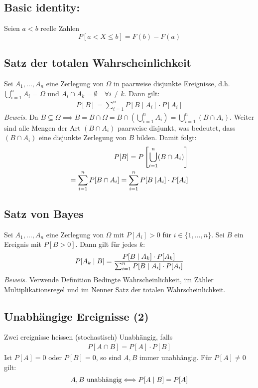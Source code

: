 \subsection{Basic identity:}
	Seien $a < b$ reelle Zahlen
	\begin{equation*}
		P [a < X \leq b] = F(b) - F(a)
	\end{equation*}
\subsection{Satz der totalen Wahrscheinlichkeit}
Sei $A_1, \dots, A_n$ eine Zerlegung von $\Omega$ in paarweise disjunkte
Ereignisse, d.h. $\bigcup_{i = 1}^n A_i = \Omega$ und $A_i \cap A_k = \emptyset
  \quad \forall i \neq k$. Dann gilt:
\begin{align*}
  P[B] = \sum_{i = 1}^n P[B \; | \; A_i] \cdot P[A_i]
\end{align*}
\emph{Beweis.}
Da $B \subseteq \Omega \implies B = B \cap \Omega
  = B \cap  (\bigcup_{i=1}^n A_i) = \bigcup_{i = 1}^n  (B \cap A_i)$.
Weiter sind alle Mengen der Art $ (B \cap A_i)$ paarweise disjunkt,
was bedeutet, dass $ (B \cap A_i)$ eine disjunkte Zerlegung von $B$
bilden. Damit folgt:
\begin{align*}
  P[B] = P \left[ \bigcup_{i = 1}^n  (B \cap A_i)\right] \\
  = \sum_{i = 1}^n P[B \cap A_i] = \sum_{i = 1}^n P[B \; | A_i] \cdot P[A_i]
\end{align*}
\subsection{Satz von Bayes}
Sei $A_1, \dots, A_n$ eine Zerlegung von $\Omega$ mit $P[A_i] > 0$ für $i \in
  \{1, \dots, n\}$. Sei $B$ ein Ereignis mit $P[B > 0]$. Dann gilt für jedes $k$:
\begin{align*}
  P[A_k \; | \; B] = \frac{P[B \; | \; A_k] \cdot P[A_k] }{\sum_{i = 1}^n P[B \; | \; A_i] \cdot P[A_i]}
\end{align*}
\emph{Beweis.} Verwende Definition Bedingte Wahrscheinlichkeit,
im Zähler Multiplikationsregel und im Nenner Satz der totalen Wahrscheinlichkeit.
\subsection{Unabhängige Ereignisse  (2)}
Zwei ereignisse heissen (stochastisch) Unabhängig, falls
\begin{align*}
  P[A \cap B] = P[A] \cdot P[B]
\end{align*}
Ist $P[A] = 0$ oder $P[B] = 0$, so sind $A, B$ immer unabhängig.
Für $P[A] \neq 0$ gilt:
\begin{align*}
  A, B \text{ unabhängig} \Longleftrightarrow P[A \; | \; B] = P[A]
\end{align*}
